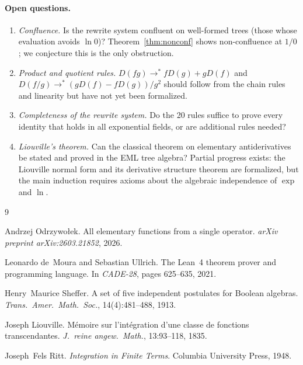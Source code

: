 \documentclass[11pt]{article}
\begin{document}
\paragraph{Open questions.}
\begin{enumerate}
\item \emph{Confluence.}
  Is the rewrite system confluent on well-formed trees (those whose
  evaluation avoids $\ln 0$)?
  Theorem~\ref{thm:nonconf} shows non-confluence at $1/0$;
  we conjecture this is the only obstruction.
\item \emph{Product and quotient rules.}
  $D(fg) \to^{*} fD(g) + gD(f)$ and $D(f/g) \to^{*}
  (gD(f) - fD(g))/g^2$ should follow from the chain rules and
  linearity but have not yet been formalized.
\item \emph{Completeness of the rewrite system.}
  Do the 20 rules suffice to prove every identity that holds in
  all exponential fields, or are additional rules needed?
\item \emph{Liouville's theorem.}
  Can the classical theorem on elementary antiderivatives be stated
  and proved in the EML tree algebra?  Partial progress exists:
  the Liouville normal form and its derivative structure theorem
  are formalized, but the main induction requires axioms about the
  algebraic independence of $\exp$ and $\ln$.
\end{enumerate}


\begin{thebibliography}{9}

Andrzej Odrzywołek.
\newblock All elementary functions from a single operator.
\newblock \emph{arXiv preprint arXiv:2603.21852}, 2026.

Leonardo de~Moura and Sebastian Ullrich.
\newblock The {Lean}~4 theorem prover and programming language.
\newblock In \emph{CADE-28}, pages 625--635, 2021.

Henry~Maurice Sheffer.
\newblock A set of five independent postulates for {Boolean} algebras.
\newblock \emph{Trans.\ Amer.\ Math.\ Soc.}, 14(4):481--488, 1913.

Joseph Liouville.
\newblock M{\'e}moire sur l'int{\'e}gration d'une classe de fonctions
  transcendantes.
\newblock \emph{J.\ reine angew.\ Math.}, 13:93--118, 1835.

Joseph~Fels Ritt.
\newblock \emph{Integration in Finite Terms}.
\newblock Columbia University Press, 1948.

\end{thebibliography}
\end{document}
